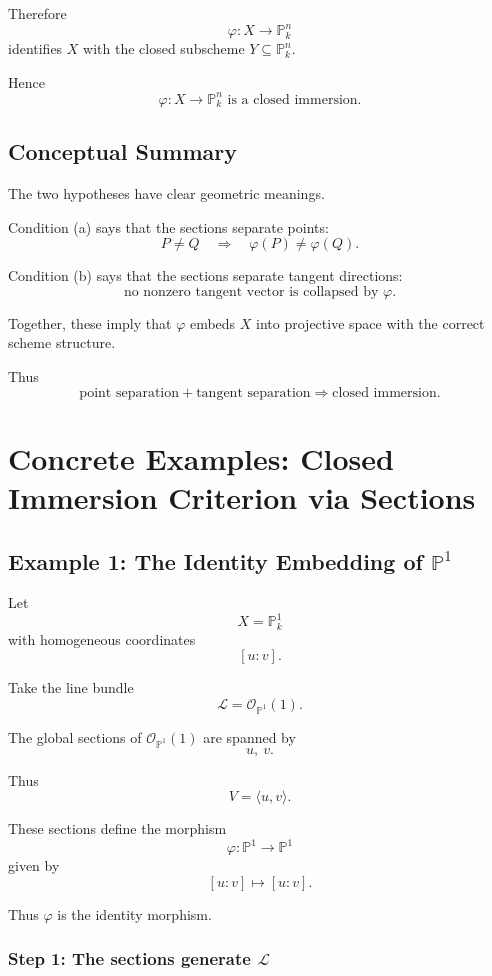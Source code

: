 \documentclass[12pt,a4paper]{article}
\theoremstyle{notespace}
\begin{document}
Therefore
\[
\varphi:X\to\mathbb P_k^n
\]
identifies $X$ with the closed subscheme $Y\subseteq\mathbb P_k^n$.

Hence
\[
\boxed{
	\varphi:X\to\mathbb P_k^n
	\text{ is a closed immersion.}
}
\]

\subsection*{Conceptual Summary}

The two hypotheses have clear geometric meanings.

Condition (a) says that the sections separate points:
\[
P\neq Q
\quad\Longrightarrow\quad
\varphi(P)\neq\varphi(Q).
\]

Condition (b) says that the sections separate tangent directions:
\[
\text{no nonzero tangent vector is collapsed by }\varphi.
\]

Together, these imply that $\varphi$ embeds $X$ into projective space with
the correct scheme structure.

Thus
\[
\boxed{
	\text{point separation}+\text{tangent separation}
	\Longrightarrow
	\text{closed immersion}.
}
\]
\section{Concrete Examples: Closed Immersion Criterion via Sections}

\subsection{Example 1: The Identity Embedding of \texorpdfstring{$\mathbb P^1$}{P1}}

Let
\[
X=\mathbb P^1_k
\]
with homogeneous coordinates
\[
[u:v].
\]

Take the line bundle
\[
\mathcal L=\mathcal O_{\mathbb P^1}(1).
\]

The global sections of \(\mathcal O_{\mathbb P^1}(1)\) are spanned by
\[
u,\ v.
\]

Thus
\[
V=\langle u,v\rangle.
\]

These sections define the morphism
\[
\varphi:\mathbb P^1\to\mathbb P^1
\]
given by
\[
[u:v]\longmapsto [u:v].
\]

Thus \(\varphi\) is the identity morphism.

\subsubsection*{Step 1: The sections generate \(\mathcal L\)}
\end{document}
